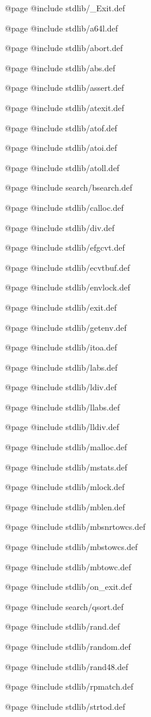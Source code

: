 @page
@include stdlib/_Exit.def

@page
@include stdlib/a64l.def

@page
@include stdlib/abort.def

@page
@include stdlib/abs.def

@page
@include stdlib/assert.def

@page
@include stdlib/atexit.def

@page
@include stdlib/atof.def

@page
@include stdlib/atoi.def

@page
@include stdlib/atoll.def

@page
@include search/bsearch.def

@page
@include stdlib/calloc.def

@page
@include stdlib/div.def

@page
@include stdlib/efgcvt.def

@page
@include stdlib/ecvtbuf.def

@page
@include stdlib/envlock.def

@page
@include stdlib/exit.def

@page
@include stdlib/getenv.def

@page
@include stdlib/itoa.def

@page
@include stdlib/labs.def

@page
@include stdlib/ldiv.def

@page
@include stdlib/llabs.def

@page
@include stdlib/lldiv.def

@page
@include stdlib/malloc.def

@page
@include stdlib/mstats.def

@page
@include stdlib/mlock.def

@page
@include stdlib/mblen.def

@page
@include stdlib/mbsnrtowcs.def

@page
@include stdlib/mbstowcs.def

@page
@include stdlib/mbtowc.def

@page
@include stdlib/on_exit.def

@page
@include search/qsort.def

@page
@include stdlib/rand.def

@page
@include stdlib/random.def

@page
@include stdlib/rand48.def

@page
@include stdlib/rpmatch.def

@page
@include stdlib/strtod.def


